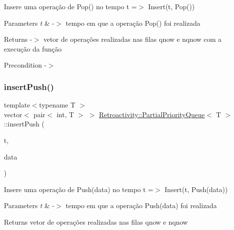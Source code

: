 Insere uma operação de Pop() no tempo t =$>$ Insert(t, Pop())


\begin{DoxyParams}{Parameters}
{\em t} & -\/$>$ tempo em que a operação Pop() foi realizada \\
\hline
\end{DoxyParams}
\begin{DoxyReturn}{Returns}
-\/$>$ vetor de operações realizadas nas filas qnow e nqnow com a execução da função 
\end{DoxyReturn}
\begin{DoxyPrecond}{Precondition}
-\/$>$ 
\end{DoxyPrecond}
\mbox{\label{classRetroactivity_1_1PartialPriorityQueue_aeeb8ac70ed65a8110fa74d14311ef038}} 
\subsubsection{\texorpdfstring{insert\+Push()}{insertPush()}}
{\footnotesize\ttfamily template$<$typename T $>$ \\
vector$<$ pair$<$ int, T $>$ $>$ \hyperlink{classRetroactivity_1_1PartialPriorityQueue}{Retroactivity\+::\+Partial\+Priority\+Queue}$<$ T $>$\+::insert\+Push (\begin{DoxyParamCaption}\item[{int}]{t,  }\item[{T}]{data }\end{DoxyParamCaption})}

Insere uma operação de Push(data) no tempo t =$>$ Insert(t, Push(data))


\begin{DoxyParams}{Parameters}
{\em t} & -\/$>$ tempo em que a operação Push(data) foi realizada \\
\hline
\end{DoxyParams}
\begin{DoxyReturn}{Returns}
vetor de operações realizadas nas filas qnow e nqnow 
\end{DoxyReturn}
\mbox{\label{classRetroactivity_1_1PartialPriorityQueue_a52de0058dfbd1d4d2ca38af42302fe04}} 
